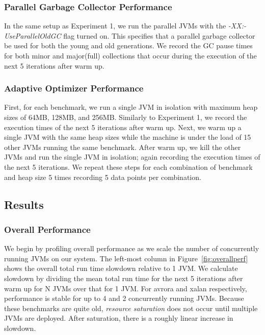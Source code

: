 \documentclass{sig-alternate}
\begin{document}
\subsubsection{Parallel Garbage Collector Performance}
In the same setup as Experiment 1, we run the parallel JVMs with the \textit{-XX:-UseParallelOldGC} flag turned on. This specifies that a parallel garbage collector be used for both the young and old generations. We record the GC pause times for both minor and major(full) collections that occur during the execution of the next 5 iterations after warm up.

\subsubsection{Adaptive Optimizer Performance}
First, for each benchmark, we run a single JVM in isolation with maximum heap sizes of 64MB, 128MB, and 256MB. Similarly to Experiment 1, we record the execution times of the next 5 iterations after warm up. Next, we warm up a single JVM with the same heap sizes while the machine is under the load of 15 other JVMs running the same benchmark. After warm up, we kill the other JVMs and run the single JVM in isolation; again recording the execution times of the next 5 iterations. We repeat these steps for each combination of benchmark and heap size 5 times recording 5 data points per combination.

\subsection{Results}

\subsubsection{Overall Performance} \label{sssec:overallperfresults}
We begin by profiling overall performance as we scale the number of concurrently running JVMs on our system. The left-most column in Figure~\ref{fig:overallperf} shows the overall total run time slowdown relative to 1 JVM. We calculate slowdown by dividing the mean total run time for the next 5 iterations after warm up for N JVMs over that for 1 JVM. For avrora and xalan respectively, performance is stable for up to 4 and 2 concurrently running JVMs. Because these benchmarks are quite old, \textit{resource saturation} does not occur until multiple JVMs are deployed. After saturation, there is a roughly linear increase in slowdown.
\end{document}
